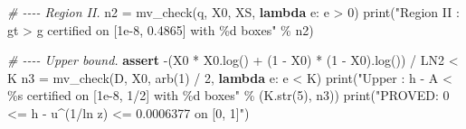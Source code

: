 \documentclass[
  11pt,
]{article}
\newenvironment{Shaded}{}{}
\newcommand{\BuiltInTok}[1]{\textcolor[rgb]{0.00,0.50,0.00}{#1}}
\newcommand{\CommentTok}[1]{\textcolor[rgb]{0.38,0.63,0.69}{\textit{#1}}}
\newcommand{\ControlFlowTok}[1]{\textcolor[rgb]{0.00,0.44,0.13}{\textbf{#1}}}
\newcommand{\DecValTok}[1]{\textcolor[rgb]{0.25,0.63,0.44}{#1}}
\newcommand{\KeywordTok}[1]{\textcolor[rgb]{0.00,0.44,0.13}{\textbf{#1}}}
\newcommand{\NormalTok}[1]{#1}
\newcommand{\OperatorTok}[1]{\textcolor[rgb]{0.40,0.40,0.40}{#1}}
\newcommand{\SpecialCharTok}[1]{\textcolor[rgb]{0.25,0.44,0.63}{#1}}
\newcommand{\StringTok}[1]{\textcolor[rgb]{0.25,0.44,0.63}{#1}}
\begin{document}
\begin{Shaded}
\begin{Highlighting}[]
\CommentTok{\# {-}{-}{-}{-} Region II.}
\NormalTok{n2 }\OperatorTok{=}\NormalTok{ mv\_check(q, X0, XS, }\KeywordTok{lambda}\NormalTok{ e: e }\OperatorTok{\textgreater{}} \DecValTok{0}\NormalTok{)}
\BuiltInTok{print}\NormalTok{(}\StringTok{"Region II : gt \textgreater{} g certified on [1e{-}8, 0.4865] with }\SpecialCharTok{\%d}\StringTok{ boxes"} \OperatorTok{\%}\NormalTok{ n2)}

\CommentTok{\# {-}{-}{-}{-} Upper bound.}
\ControlFlowTok{assert} \OperatorTok{{-}}\NormalTok{(X0 }\OperatorTok{*}\NormalTok{ X0.log() }\OperatorTok{+}\NormalTok{ (}\DecValTok{1} \OperatorTok{{-}}\NormalTok{ X0) }\OperatorTok{*}\NormalTok{ (}\DecValTok{1} \OperatorTok{{-}}\NormalTok{ X0).log()) }\OperatorTok{/}\NormalTok{ LN2 }\OperatorTok{\textless{}}\NormalTok{ K}
\NormalTok{n3 }\OperatorTok{=}\NormalTok{ mv\_check(D, X0, arb(}\DecValTok{1}\NormalTok{) }\OperatorTok{/} \DecValTok{2}\NormalTok{, }\KeywordTok{lambda}\NormalTok{ e: e }\OperatorTok{\textless{}}\NormalTok{ K)}
\BuiltInTok{print}\NormalTok{(}\StringTok{"Upper     : h {-} A \textless{} }\SpecialCharTok{\%s}\StringTok{ certified on [1e{-}8, 1/2] with }\SpecialCharTok{\%d}\StringTok{ boxes"} \OperatorTok{\%}\NormalTok{ (K.}\BuiltInTok{str}\NormalTok{(}\DecValTok{5}\NormalTok{), n3))}
\BuiltInTok{print}\NormalTok{(}\StringTok{"PROVED: 0 \textless{}= h {-} u\^{}(1/ln z) \textless{}= 0.0006377 on [0, 1]"}\NormalTok{)}
\end{Highlighting}
\end{Shaded}
\end{document}
